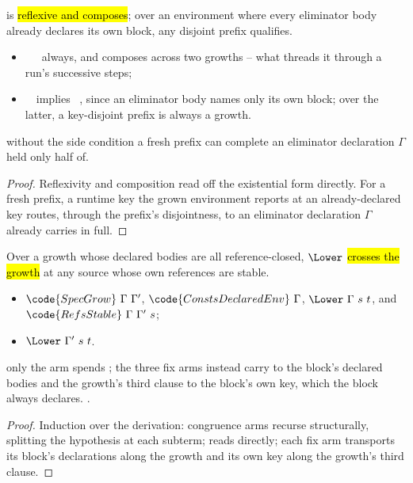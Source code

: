 \begin{lemma}
\label{lem:SpecGrow-of_fresh}
\leanok
{}
  is \hl{reflexive and composes}; over an environment where every
eliminator body already declares its own block, any disjoint prefix qualifies.
\begin{itemize}
\item {}\ \Gamma\ \Gamma\ always, and  composes across two growths --
what threads it through a run's successive steps;
\item {}\ \Gamma\ implies \ \Gamma, since an eliminator
body names only its own block; over the latter, a key-disjoint prefix is always a growth.
\end{itemize}
 without the side condition a fresh prefix can complete an eliminator declaration $\Gamma$
held only half of.
\end{lemma}
\begin{proof}
\leanok
{}
 Reflexivity and composition read off the existential form directly. For a fresh prefix, a
runtime key the grown environment reports at an already-declared key routes, through the prefix's
disjointness, to an eliminator declaration $\Gamma$ already carries in full.
\end{proof}

\begin{theorem}
\label{thm:Lower-specGrow}
\leanok
{}
 Over a growth whose declared bodies are all reference-closed, $\Lower$ \hl{crosses the
growth} at any source whose own references are stable.
\begin{itemize}
\item {} $\code{SpecGrow}\ \Gamma\ \Gamma'$, $\code{ConstsDeclaredEnv}\ \Gamma$,
$\Lower\ \Gamma\ s\ t$, and $\code{RefsStable}\ \Gamma\ \Gamma'\ s$;
\item {} $\Lower\ \Gamma'\ s\ t$.
\end{itemize}
 only the  arm spends ; the three fix arms instead carry
 to the block's declared bodies and the growth's third clause to the block's own
key, which the block always declares.
 \stProved{}.
\end{theorem}
\begin{proof}
\leanok
{}
 Induction over the derivation: congruence arms recurse structurally, splitting the
hypothesis at each subterm;  reads  directly; each fix arm transports its
block's declarations along the growth and its own key along the growth's third clause.
\end{proof}

